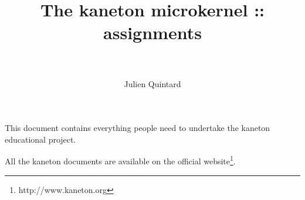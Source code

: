 %
%
%
%
%
%

%
%

%
%

\def\path{../../..}

%
%



%
%

\rhead{}

%
%

\title{The kaneton microkernel :: assignments \\
       \version \\
       \logos}

%
%

\author{\small{Julien Quintard}}

%
%



%
%

\maketitle

%
%

This document contains everything people need to undertake the kaneton
educational project.

\-

All the kaneton documents are available on
  the official website\footnote{http://www.kaneton.org}.

%
%

\toc

%
%















